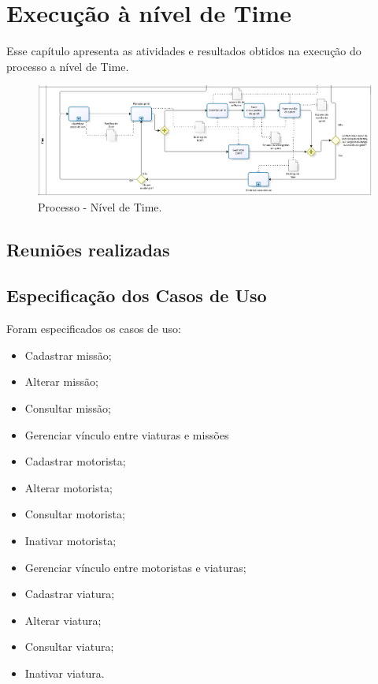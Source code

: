 \chapter{Execução à nível de Time}

  Esse capítulo apresenta as atividades e resultados obtidos na execução do processo a nível de Time.
  
  \begin{figure}[!htbp]
    \centering
    \includegraphics[scale=0.33]{figuras/processo_time}
    \caption[Processo - Nível de Time]{Processo - Nível de Time.}
    \label{processo_time}
  \end{figure}
  
  \section{Reuniões realizadas}
  
  
  \section{Especificação dos Casos de Uso}
 
  Foram especificados os casos de uso:
  
  \begin{itemize}
    \item Cadastrar missão;
    \item Alterar missão;
    \item Consultar missão;
    \item Gerenciar vínculo entre viaturas e missões
    \item Cadastrar motorista;
    \item Alterar motorista;
    \item Consultar motorista;
    \item Inativar motorista;
    \item Gerenciar vínculo entre motoristas e viaturas;
    \item Cadastrar viatura;
    \item Alterar viatura;
    \item Consultar viatura;
    \item Inativar viatura.
  \end{itemize}

